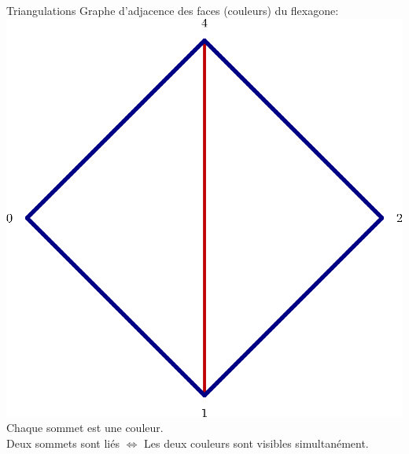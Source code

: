 \documentclass[french,xcolor=dvipsnames]{beamer}
\begin{document}
		\begin{frame}{Triangulations}
			Graphe d'adjacence des faces (couleurs) du flexagone:
			\includegraphics[scale=0.3]{triangu_4.eps}\\
			Chaque sommet est une couleur.\\
			Deux sommets sont liés $\Leftrightarrow$ Les deux couleurs sont visibles simultanément.
		\end{frame}
		
\end{document}

